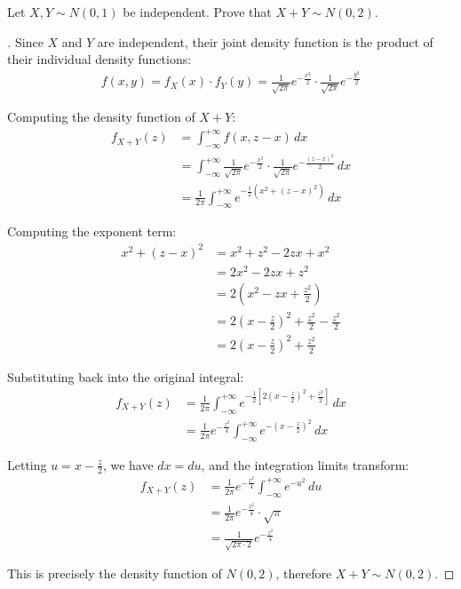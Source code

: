 \begin{example}{}
Let $X, Y \sim N(0,1)$ be independent. Prove that $X+Y \sim N(0,2)$.
\end{example}

\begin{proof}[]{}
Since $X$ and $Y$ are independent, their joint density function is the product of their individual density functions:
\begin{align*}
f(x,y) = f_X(x) \cdot f_Y(y) = \frac{1}{\sqrt{2\pi}}e^{-\frac{x^2}{2}} \cdot \frac{1}{\sqrt{2\pi}}e^{-\frac{y^2}{2}}
\end{align*}

Computing the density function of $X+Y$:
\begin{align*}
f_{X+Y}(z) &= \int_{-\infty}^{+\infty} f(x, z-x) \,dx\\
&= \int_{-\infty}^{+\infty} \frac{1}{\sqrt{2\pi}}e^{-\frac{x^2}{2}} \cdot \frac{1}{\sqrt{2\pi}}e^{-\frac{(z-x)^2}{2}} \,dx\\
&= \frac{1}{2\pi}\int_{-\infty}^{+\infty} e^{-\frac{1}{2}(x^2 + (z-x)^2)} \,dx
\end{align*}

Computing the exponent term:
\begin{align*}
x^2 + (z-x)^2 &= x^2 + z^2 - 2zx + x^2\\
&= 2x^2 - 2zx + z^2\\
&= 2(x^2 - zx + \frac{z^2}{2})\\
&= 2(x - \frac{z}{2})^2 + \frac{z^2}{2} - \frac{z^2}{2}\\
&= 2(x - \frac{z}{2})^2 + \frac{z^2}{2}
\end{align*}

Substituting back into the original integral:
\begin{align*}
f_{X+Y}(z) &= \frac{1}{2\pi}\int_{-\infty}^{+\infty} e^{-\frac{1}{2}[2(x - \frac{z}{2})^2 + \frac{z^2}{2}]} \,dx\\
&= \frac{1}{2\pi}e^{-\frac{z^2}{4}}\int_{-\infty}^{+\infty} e^{-(x - \frac{z}{2})^2} \,dx
\end{align*}

Letting $u = x - \frac{z}{2}$, we have $dx = du$, and the integration limits transform:
\begin{align*}
f_{X+Y}(z) &= \frac{1}{2\pi}e^{-\frac{z^2}{4}}\int_{-\infty}^{+\infty} e^{-u^2} \,du\\
&= \frac{1}{2\pi}e^{-\frac{z^2}{4}} \cdot \sqrt{\pi}\\
&= \frac{1}{\sqrt{2\pi \cdot 2}}e^{-\frac{z^2}{4}}
\end{align*}

This is precisely the density function of $N(0,2)$, therefore $X+Y \sim N(0,2)$.
\end{proof}


